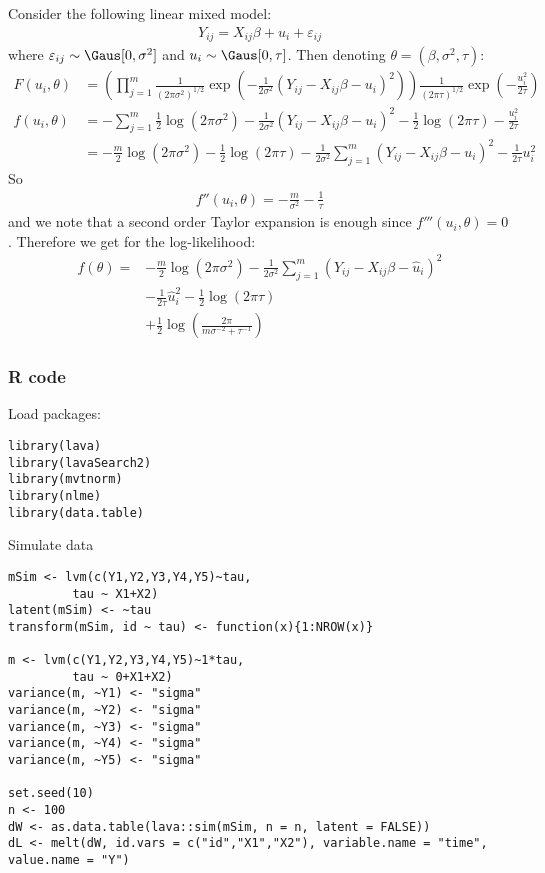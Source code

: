\documentclass[12pt]{article}
\begin{document}
Consider the following linear mixed model:
\begin{align*}
Y_{ij} = X_{ij} \beta + u_i + \varepsilon_{ij} 
\end{align*}
where \(\varepsilon_{ij} \sim \Gaus[0,\sigma^2]\) and \(u_i \sim
\Gaus[0,\tau]\). Then denoting \(\theta = (\beta,\sigma^2,\tau)\):
\begin{align*}
F(u_i,\theta) &= \left( \prod_{j=1}^m \frac{1}{(2\pi \sigma^2)^{1/2}} \exp\left(-\frac{1}{2\sigma^2} (Y_{ij}-X_{ij}\beta-u_i)^2 \right) \right)
 \frac{1}{(2\pi \tau)^{1/2}} \exp\left(-\frac{u_i^2}{2\tau} \right) \\
f(u_i,\theta) &= - \sum_{j=1}^m \frac{1}{2} \log(2\pi \sigma^2) -\frac{1}{2\sigma^2} (Y_{ij}-X_{ij}\beta-u_i)^2 
- \frac{1}{2} \log(2\pi \tau) -\frac{u_i^2}{2\tau} \\
&=  - \frac{m}{2} \log(2\pi \sigma^2) - \frac{1}{2} \log(2\pi \tau) 
- \frac{1}{2\sigma^2} \sum_{j=1}^m (Y_{ij}-X_{ij}\beta-u_i)^2 
- \frac{1}{2\tau} u_i^2 
\end{align*}
So
\begin{align*}
f''(u_i,\theta) = - \frac{m}{\sigma^2} - \frac{1}{\tau} 
\end{align*}
and we note that a second order Taylor expansion is enough since
\(f'''(u_i,\theta)=0\). Therefore we get for the log-likelihood:
\begin{align*}
f(\theta) =
& - \frac{m}{2} \log(2\pi \sigma^2) - \frac{1}{2\sigma^2} \sum_{j=1}^m (Y_{ij}-X_{ij}\beta-\hat{u}_i)^2  \\
& - \frac{1}{2\tau} \hat{u}_i^2 - \frac{1}{2} \log(2\pi \tau) \\
& + \frac{1}{2} \log\left(\frac{2 \pi}{m\sigma^{-2} + \tau^{-1}}\right) 
\end{align*}

\clearpage 

\subsubsection{R code}
\label{sec:orge2c8e3c}

Load packages:
\lstset{language=r,label= ,caption= ,captionpos=b,numbers=none}
\begin{lstlisting}
library(lava)
library(lavaSearch2)
library(mvtnorm)
library(nlme)
library(data.table)
\end{lstlisting}

Simulate data
\lstset{language=r,label= ,caption= ,captionpos=b,numbers=none}
\begin{lstlisting}
mSim <- lvm(c(Y1,Y2,Y3,Y4,Y5)~tau,
		 tau ~ X1+X2)
latent(mSim) <- ~tau
transform(mSim, id ~ tau) <- function(x){1:NROW(x)}

m <- lvm(c(Y1,Y2,Y3,Y4,Y5)~1*tau,
		 tau ~ 0+X1+X2)
variance(m, ~Y1) <- "sigma"
variance(m, ~Y2) <- "sigma"
variance(m, ~Y3) <- "sigma"
variance(m, ~Y4) <- "sigma"
variance(m, ~Y5) <- "sigma"

set.seed(10)
n <- 100
dW <- as.data.table(lava::sim(mSim, n = n, latent = FALSE))
dL <- melt(dW, id.vars = c("id","X1","X2"), variable.name = "time", value.name = "Y")
\end{lstlisting}
\end{document}
